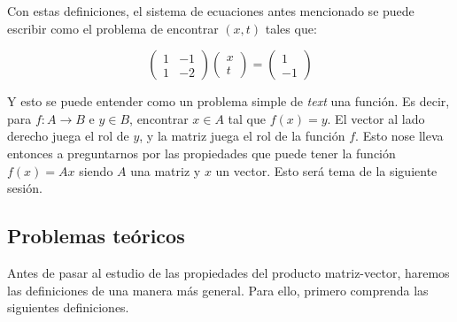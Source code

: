 Con estas definiciones, el sistema de ecuaciones antes mencionado se puede escribir como el problema de encontrar $(x, t)$ tales que:

$$  \begin{pmatrix} 1 & -1 \\ 1 & -2  \end{pmatrix} \begin{pmatrix} x \\ t \end{pmatrix} = \begin{pmatrix} 1 \\ -1  \end{pmatrix}$$

Y esto se puede entender como un problema simple de \textit{text} una función. Es decir, para $f: A \to B$ e $y \in B$, encontrar $x \in A$ tal que $f(x) = y$. El vector al lado derecho juega el rol de $y$, y la matriz juega el rol de la función $f$. Esto nose lleva entonces a preguntarnos por las propiedades que puede tener la función $f(x) = Ax$ siendo $A$ una matriz y $x$ un vector. Esto será tema de la siguiente sesión.

\subsection{Problemas teóricos}

Antes de pasar al estudio de las propiedades del producto matriz-vector, haremos las definiciones de una manera más general. Para ello, primero comprenda las siguientes definiciones.

